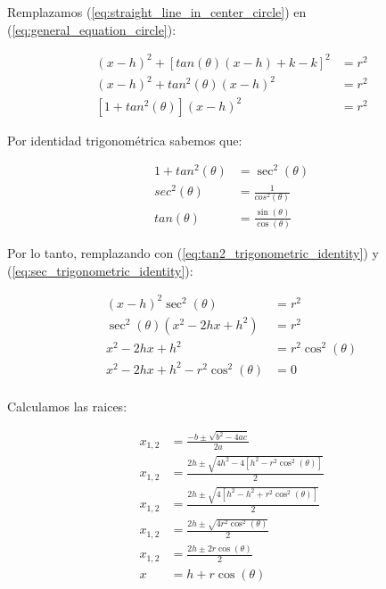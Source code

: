 \documentclass[oneside, a4paper]{article}
\begin{document}
            Remplazamos (\ref{eq:straight_line_in_center_circle}) en (\ref{eq:general_equation_circle}):

            \begin{align*}
                (x - h)^2 + [tan(\theta)(x - h) + k - k]^2 & = r^2 \\
                (x - h)^2 + tan^2(\theta)(x - h)^2         & = r^2 \\
                [1 + tan^2(\theta)](x - h)^2               & = r^2
            \end{align*}

            Por identidad trigonométrica sabemos que:

            \begin{align}
                1 + tan^2(\theta) & = \sec^2(\theta)\label{eq:tan2_trigonometric_identity}                   \\
                sec^2(\theta)     & = \frac{1}{cos^2(\theta)}\label{eq:sec_trigonometric_identity}           \\
                tan(\theta)       & = \frac{\sin(\theta)}{\cos(\theta)}\label{eq:tan_trigonometric_identity}
            \end{align}

            Por lo tanto, remplazando con (\ref{eq:tan2_trigonometric_identity}) y (\ref{eq:sec_trigonometric_identity}):

            \begin{align*}
                (x - h)^2\sec^2(\theta)             & = r^2               \\
                \sec^2(\theta)(x^2 - 2hx + h^2)     & = r^2               \\
                x^2 - 2hx + h^2                     & = r^2\cos^2(\theta) \\
                x^2 - 2hx + h^2 - r^2\cos^2(\theta) & = 0                 \\
            \end{align*}

            Calculamos las raices:

            \begin{align}
                x_{1,2} & = \frac{-b \pm \sqrt{b^2 - 4ac}}{2a}\nonumber                            \\
                x_{1,2} & = \frac{2h \pm \sqrt{4h^2 - 4[h^2 - r^2\cos^2(\theta)]}}{2}\nonumber     \\
                x_{1,2} & = \frac{2h \pm \sqrt{4[h^2 - h^2 + r^2\cos^2(\theta)]}}{2}\nonumber      \\
                x_{1,2} & = \frac{2h \pm \sqrt{4r^2\cos^2(\theta)}}{2}\nonumber                    \\
                x_{1,2} & = \frac{2h \pm 2r\cos(\theta)}{2}\nonumber                               \\
                x       & = h + r\cos(\theta)\label{eq:coordinate_root_intersection_line_circle}
            \end{align}
\end{document}
